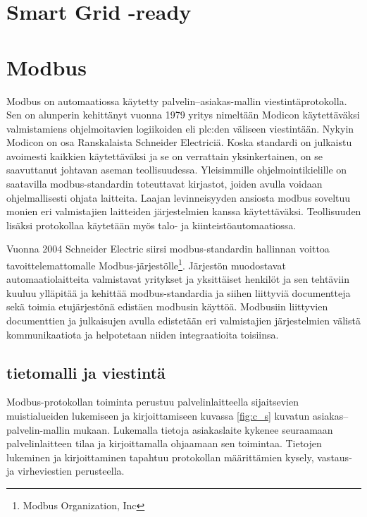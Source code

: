 \section{Smart Grid -ready}


\section{Modbus}

  Modbus on automaatiossa käytetty palvelin--asiakas-mallin viestintäprotokolla. Sen on alunperin kehittänyt vuonna 1979 yritys nimeltään Modicon käytettäväksi valmistamiens ohjelmoitavien logiikoiden eli \Gls{plc}:den väliseen viestintään. Nykyin Modicon on osa Ranskalaista Schneider Electriciä. Koska standardi on julkaistu avoimesti kaikkien käytettäväksi ja se on verrattain yksinkertainen, on se saavuttanut johtavan aseman teollisuudessa. Yleisimmille ohjelmointikielille on saatavilla modbus-standardin toteuttavat kirjastot, joiden avulla voidaan ohjelmallisesti  ohjata laitteita. Laajan levinneisyyden ansiosta modbus soveltuu monien eri valmistajien laitteiden järjestelmien kanssa käytettäväksi. Teollisuuden lisäksi protokollaa käytetään myös talo- ja kiinteistöautomaatiossa.\parencite{sousaPortugal, modbusAppSpec, modbusOrg}

  Vuonna 2004 Schneider Electric siirsi modbus-standardin hallinnan voittoa tavoittelemattomalle Modbus-järjestölle\footnote{Modbus Organization, Inc}. Järjestön muodostavat automaatiolaitteita valmistavat yritykset ja yksittäiset henkilöt ja sen tehtäviin kuuluu ylläpitää ja kehittää modbus-standardia ja siihen liittyviä documentteja sekä toimia etujärjestönä edistäen modbusin käyttöä. Modbusiin liittyvien documenttien ja julkaisujen avulla edistetään eri valmistajien järjestelmien välistä kommunikaatiota ja helpotetaan niiden integraatioita toisiinsa.  \parencite{modbusOrg}

  \subsection{tietomalli ja viestintä}

  Modbus-protokollan toiminta perustuu palvelinlaitteella sijaitsevien muistialueiden lukemiseen ja kirjoittamiseen kuvassa \ref{fig:c_s} kuvatun asiakas--palvelin-mallin mukaan.  Lukemalla tietoja asiakaslaite kykenee seuraamaan palvelinlaitteen tilaa ja kirjoittamalla ohjaamaan sen toimintaa. Tietojen lukeminen ja kirjoittaminen tapahtuu protokollan määrittämien kysely, vastaus- ja virheviestien perusteella.

